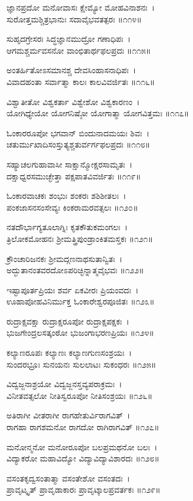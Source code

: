 	ಜ್ಞಾನಪ್ರದೋ ಮನೋವಾಸಃ ಕ್ಷೇಮ್ಯೋ ಮೋಹವಿನಾಶನಃ~।\\
	ಸುರೋತ್ತಮಶ್ಚಿತ್ರಭಾನುಃ ಸದಾವೈಭವತತ್ಪರಃ ॥೧೧೪॥

ಸುಹೃದಗ್ರೇಸರಃ ಸಿದ್ಧಜ್ಞಾನಮುದ್ರೋ ಗಣಾಧಿಪಃ~।\\
ಆಗಮಶ್ಚರ್ಮವಸನೋ ವಾಂಛಿತಾರ್ಥಫಲಪ್ರದಃ ॥೧೧೫॥

	ಅಂತರ್ಹಿತೋಽಸಮಾನಶ್ಚ ದೇವಸಿಂಹಾಸನಾಧಿಪಃ~।\\
	ವಿವಾದಹಂತಾ ಸರ್ವಾತ್ಮಾ ಕಾಲಃ ಕಾಲವಿವರ್ಜಿತಃ ॥೧೧೬॥

ವಿಶ್ವಾತೀತೋ ವಿಶ್ವಕರ್ತಾ ವಿಶ್ವೇಶೋ ವಿಶ್ವಕಾರಣಂ~।\\
ಯೋಗಿಧ್ಯೇಯೋ ಯೋಗನಿಷ್ಠೋ ಯೋಗಾತ್ಮಾ ಯೋಗವಿತ್ತಮಃ ॥೧೧೭॥

	ಓಂಕಾರರೂಪೋ ಭಗವಾನ್ ಬಿಂದುನಾದಮಯಃ ಶಿವಃ~।\\
	ಚತುರ್ಮುಖಾದಿಸಂಸ್ತುತ್ಯಶ್ಚತುರ್ವರ್ಗಫಲಪ್ರದಃ ॥೧೧೮॥

ಸಹ್ಯಾಚಲಗುಹಾವಾಸೀ ಸಾಕ್ಷಾನ್ಮೋಕ್ಷರಸಾಮೃತಃ~।\\
ದಕ್ಷಾಧ್ವರಸಮುಚ್ಛೇತ್ತಾ ಪಕ್ಷಪಾತವಿವರ್ಜಿತಃ ॥೧೧೯॥

	ಓಂಕಾರವಾಚಕಃ ಶಂಭುಃ ಶಂಕರಃ ಶಶಿಶೀತಲಃ~।\\
	ಪಂಕಜಾಸನಸಂಸೇವ್ಯಃ ಕಿಂಕರಾಮರವತ್ಸಲಃ ॥೧೨೦॥

ನತದೌರ್ಭಾಗ್ಯತೂಲಾಗ್ನಿಃ ಕೃತಕೌತುಕಮಂಗಲಃ~।\\
ತ್ರಿಲೋಕಮೋಹನಃ ಶ್ರೀಮತ್ತ್ರಿಪುಂಡ್ರಾಂಕಿತಮಸ್ತಕಃ ॥೧೨೧॥

	ಕ್ರೌಂಚಾರಿಜನಕಃ ಶ್ರೀಮದ್ಗಣನಾಥಸುತಾನ್ವಿತಃ~।\\
	ಅದ್ಭುತಾನಂತವರದೋಽಪರಿಚ್ಛಿನ್ನಾತ್ಮವೈಭವಃ ॥೧೨೨॥

ಇಷ್ಟಾಪೂರ್ತಪ್ರಿಯಃ ಶರ್ವ ಏಕವೀರಃ ಪ್ರಿಯಂವದಃ~।\\
ಊಹಾಪೋಹವಿನಿರ್ಮುಕ್ತ ಓಂಕಾರೇಶ್ವರಪೂಜಿತಃ ॥೧೨೩॥

	ರುದ್ರಾಕ್ಷವಕ್ಷಾ ರುದ್ರಾಕ್ಷರೂಪೋ ರುದ್ರಾಕ್ಷಪಕ್ಷಕಃ~।\\
	ಭುಜಗೇಂದ್ರಲಸತ್ಕಂಠೋ ಭುಜಂಗಾಭರಣಪ್ರಿಯಃ ॥೧೨೪॥

ಕಲ್ಯಾಣರೂಪಃ ಕಲ್ಯಾಣಃ ಕಲ್ಯಾಣಗುಣಸಂಶ್ರಯಃ~।\\
ಸುಂದರಭ್ರೂಃ ಸುನಯನಃ ಸುಲಲಾಟಃ ಸುಕಂಧರಃ ॥೧೨೫॥

	ವಿದ್ವಜ್ಜನಾಶ್ರಯೋ ವಿದ್ವಜ್ಜನಸ್ತವ್ಯಪರಾಕ್ರಮಃ~।\\
	ವಿನೀತವತ್ಸಲೋ ನೀತಿಸ್ವರೂಪೋ ನೀತಿಸಂಶ್ರಯಃ ॥೧೨೬॥

ಅತಿರಾಗೀ ವೀತರಾಗೀ ರಾಗಹೇತುರ್ವಿರಾಗವಿತ್~।\\
ರಾಗಹಾ ರಾಗಶಮನೋ ರಾಗದೋ ರಾಗಿರಾಗವಿತ್ ॥೧೨೭॥

	ಮನೋನ್ಮನೋ ಮನೋರೂಪೋ ಬಲಪ್ರಮಥನೋ ಬಲಃ~।\\
	ವಿದ್ಯಾಕರೋ ಮಹಾವಿದ್ಯೋ ವಿದ್ಯಾವಿದ್ಯಾವಿಶಾರದಃ ॥೧೨೮॥

ವಸಂತಕೃದ್ವಸಂತಾತ್ಮಾ ವಸಂತೇಶೋ ವಸಂತದಃ~।\\
ಪ್ರಾವೃಟ್ಕೃತ್ ಪ್ರಾವೃಡಾಕಾರಃ ಪ್ರಾವೃಟ್ಕಾಲಪ್ರವರ್ತಕಃ ॥೧೨೯॥

